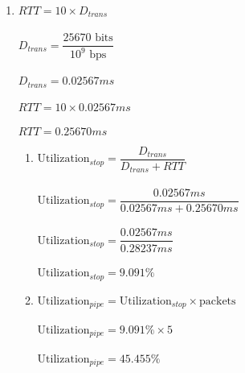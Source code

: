 \documentclass[12pt]{article}
\begin{document}
\begin{enumerate}
	\item $RTT = 10 \times D_{trans}$\\
			\\
			$D_{trans} = \dfrac{25670\text{ bits}}{10^{9}\text{ bps}}$\\
			\\
			$D_{trans} = 0.02567ms$\\
			\\
			$RTT = 10 \times 0.02567ms$\\
			\\
			$RTT = 0.25670ms$
		\begin{enumerate}
			\item $\text{Utilization}_{stop} = \dfrac{D_{trans}}{D_{trans} + RTT}$\\
				\\
				$\text{Utilization}_{stop} = \dfrac{0.02567ms}{0.02567ms + 0.25670ms}$\\
				\\
				$\text{Utilization}_{stop} = \dfrac{0.02567ms}{0.28237ms}$\\
				\\
				$\text{Utilization}_{stop} = 9.091\%$
			\item $\text{Utilization}_{pipe} = \text{Utilization}_{stop} \times \text{packets}$\\
				\\
				$\text{Utilization}_{pipe} = 9.091\% \times 5$\\
				\\
				$\text{Utilization}_{pipe} = 45.455\%$
		\end{enumerate}


\end{enumerate}
\end{document}
